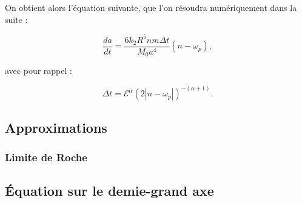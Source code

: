 \documentclass[12pt,a4paper]{article}
\begin{document}
    On obtient alors l’équation suivante, que l’on résoudra numériquement dans la suite :

\[
\frac{da}{dt}
=
\frac{6k_2R^5nm\Delta t}{M_0a^4}(n-\omega_p),
\]

avec pour rappel :

\[
\Delta t
=
\mathcal{E}^{\alpha}
\left(2|n-\omega_p|\right)^{-(\alpha+1)}.
\]
	
	\subsection{Approximations}
	
	\subsubsection{Limite de Roche}
	
	\subsection{Équation sur le demie-grand axe}

    
    
	
	
\end{document}
